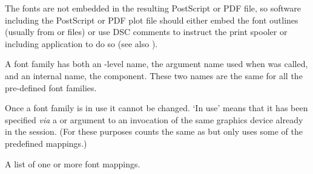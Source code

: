 \begin{Details}
The fonts are not embedded in the resulting PostScript or PDF file, so
software including the PostScript or PDF plot file should either embed
the font outlines (usually from  or  files) or
use DSC comments to instruct the print spooler or including
application to do so (see also ).

A font family has both an \R{}-level name, the argument name used when
 was called, and an internal name, the
 component.  These two names are the same for all the
pre-defined font families.

Once a font family is in use it cannot be changed.  `In use'
means that it has been specified \emph{via} a  or
 argument to an invocation of the same graphics device
already in the \R{} session.  (For these purposes  counts the
same as  but only uses some of the predefined mappings.)
\end{Details}
%
\begin{Value}
A list of one or more font mappings.
\end{Value}
%
